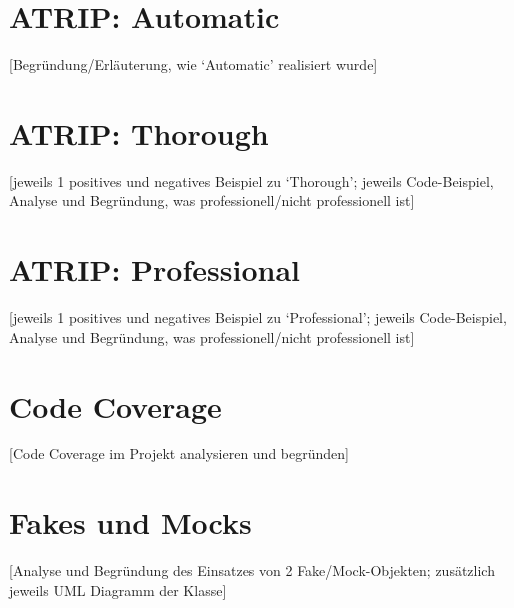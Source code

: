 \section{ATRIP: Automatic}
[Begründung/Erläuterung, wie ‘Automatic’ realisiert wurde]

\section{ATRIP: Thorough}
[jeweils 1 positives und negatives Beispiel zu ‘Thorough’; jeweils Code-Beispiel, Analyse und Begründung, was professionell/nicht professionell ist]

\section{ATRIP: Professional}
[jeweils 1 positives und negatives Beispiel zu ‘Professional’; jeweils Code-Beispiel, Analyse und Begründung, was professionell/nicht professionell ist]

\section{Code Coverage}
[Code Coverage im Projekt analysieren und begründen]

\section{Fakes und Mocks}
[Analyse und Begründung des Einsatzes von 2 Fake/Mock-Objekten; zusätzlich jeweils UML Diagramm der Klasse]